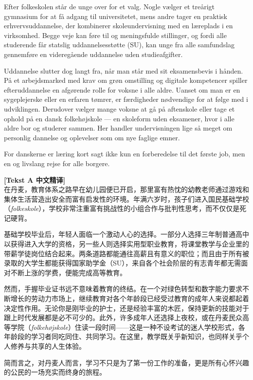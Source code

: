 Efter folkeskolen står de unge over for et  valg. Nogle vælger et treårigt gymnasium for at få adgang til universitetet, mens andre tager en praktisk erhvervsuddannelse, der kombinerer skoleundervisning med en  læreplads i en virksomhed. Begge veje kan føre til  og meningsfulde stillinger, og fordi alle  studerende får statslig uddannelsesstøtte (SU), kan  unge fra alle samfundslag gennemføre en videregående uddannelse uden  studieafgifter.

Uddannelse slutter dog langt fra, når man står med sit eksamensbevis i hånden. På et arbejdsmarked med  krav om grøn omstilling og digitale kompetencer spiller efteruddannelse en afgørende rolle for  voksne i alle aldre. Uanset om man er en  sygeplejerske eller en erfaren tømrer, er  færdigheder nødvendige for at følge med i udviklingen. Derudover vælger mange voksne at gå på aftenskole eller tage et ophold på en dansk folkehøjskole --- en  skoleform uden eksamener, hvor  i alle aldre bor og studerer sammen. Her handler undervisningen lige så meget om personlig dannelse og  oplevelser som om nye faglige emner.

For danskerne er læring kort sagt ikke kun en forberedelse til det første job, men en  og livslang rejse for alle  borgere.

\begin{transbox}
\small
\textbf{\color{NCDTeal}[Tekst A 中文精译]}\\
在丹麦，教育体系之路早在幼儿园便已开启，那里富有热忱的幼教老师通过游戏和集体生活营造出安全而富有启发性的环境。年满六岁时，孩子们进入国民基础学校（\textit{folkeskole}），学校非常注重富有挑战性的小组合作与批判性思考，而不仅仅是死记硬背。

基础学校毕业后，年轻人面临一个激动人心的选择。一部分人选择三年制普通高中以获得进入大学的资格，另一些人则选择实用型职业教育，将课堂教学与企业里的带薪学徒岗位结合起来。两条道路都能通往高薪且有意义的职位；而且由于所有被录取的大学生都能获得国家助学金（SU），来自各个社会阶层的有志青年都无需面对不断上涨的学费，便能完成高等教育。

然而，手握毕业证书远不意味着教育的终结。在一个对绿色转型和数字能力要求不断增长的劳动力市场上，继续教育对各个年龄段已经受过教育的成年人来说都起着决定性作用。无论你是刚毕业的护士，还是经验丰富的木匠，保持更新的技能对于跟上时代发展都是必不可少的。此外，许多成年人还选择上夜校，或在丹麦民众高等学院（\textit{folkehøjskole}）住读一段时间——这是一种不设考试的迷人学校形式，各年龄段的学习者同吃同住、共同学习。在这里，教学既关乎新知识，也同样关乎个人修养与共享的人生体验。

简而言之，对丹麦人而言，学习不只是为了第一份工作的准备，更是所有心怀兴趣的公民的一场充实而终身的旅程。
\end{transbox}

